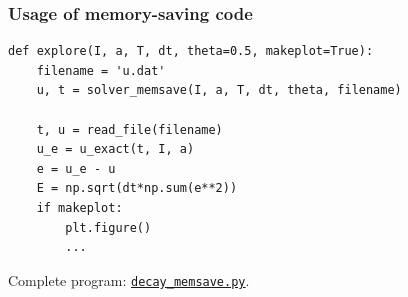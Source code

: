 \documentclass{beamer}
\begin{document}
\begin{frame}
\frametitle{Usage of memory-saving code}

\begin{verbatim}
def explore(I, a, T, dt, theta=0.5, makeplot=True):
    filename = 'u.dat'
    u, t = solver_memsave(I, a, T, dt, theta, filename)

    t, u = read_file(filename)
    u_e = u_exact(t, I, a)
    e = u_e - u
    E = np.sqrt(dt*np.sum(e**2))
    if makeplot:
        plt.figure()
        ...
\end{verbatim}

Complete program: \href{{http://tinyurl.com/ofkw6kc/alg/decay_memsave.py}}{\nolinkurl{decay_memsave.py}}.
\end{frame}
\end{document}
